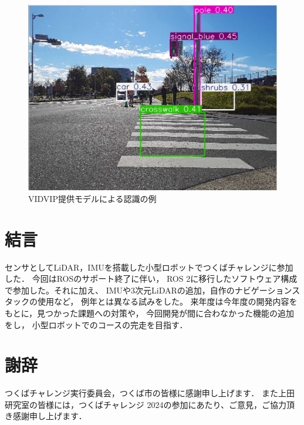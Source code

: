 \documentclass[twocolumn,9pt]{jsproceedings}
\begin{document}
\begin{figure}[h]
  \begin{center}
    \includegraphics[width=0.6\linewidth]{figs/result_of_yolo.pdf}
    \caption{VIDVIP提供モデルによる認識の例}
    \label{fig:result_yolo}
  \end{center}
\end{figure}

\section{結言}
センサとしてLiDAR，IMUを搭載した小型ロボットでつくばチャレンジに参加した．
今回はROSのサポート終了に伴い，
ROS 2に移行したソフトウェア構成で参加した。それに加え、
IMUや3次元LiDARの追加，自作のナビゲーションスタックの使用など，
例年とは異なる試みをした。
来年度は今年度の開発内容をもとに，見つかった課題への対策や，
今回開発が間に合わなかった機能の追加をし，
小型ロボットでのコースの完走を目指す．


\section*{謝辞}
つくばチャレンジ実行委員会，つくば市の皆様に感謝申し上げます．
また上田研究室の皆様には，つくばチャレンジ 2024の参加にあたり、ご意見，ご協力頂き感謝申し上げます．
\end{document}
